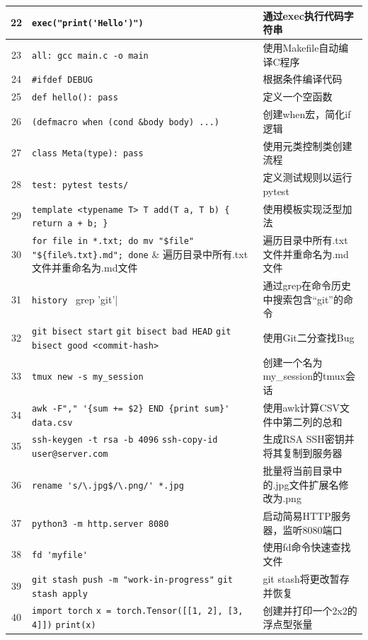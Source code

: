 \documentclass{article}
\begin{document}
\begin{longtable}{|c|p{10cm}|l|}
\hline
22 & \verb|exec("print('Hello')")| & 通过exec执行代码字符串 \\
\hline
23 & \verb|all: gcc main.c -o main| & 使用Makefile自动编译C程序 \\
\hline
24 & \verb|#ifdef DEBUG| & 根据条件编译代码 \\
\hline
25 & \verb|def hello(): pass| & 定义一个空函数 \\
\hline
26 & \verb|(defmacro when (cond &body body) ...)| & 创建when宏，简化if逻辑 \\
\hline
27 & \verb|class Meta(type): pass| & 使用元类控制类创建流程 \\
\hline
28 & \verb|test: pytest tests/| & 定义测试规则以运行pytest \\
\hline
29 & \verb|template <typename T> T add(T a, T b) { return a + b; }| & 使用模板实现泛型加法 \\
\hline
30 & \verb|for file in *.txt; do mv "$file" "${file%.txt}.md"; done| & 遍历目录中所有.txt文件并重命名为.md文件 \\
\hline
31 & \verb|history | grep 'git'| & 通过grep在命令历史中搜索包含“git”的命令 \\
\hline
32 & \verb|git bisect start| \newline \verb|git bisect bad HEAD| \newline \verb|git bisect good <commit-hash>| & 使用Git二分查找Bug \\
\hline
33 & \verb|tmux new -s my_session| & 创建一个名为my_session的tmux会话 \\
\hline
34 & \verb|awk -F"," '{sum += $2} END {print sum}' data.csv| & 使用awk计算CSV文件中第二列的总和 \\
\hline
35 & \verb|ssh-keygen -t rsa -b 4096| \newline \verb|ssh-copy-id user@server.com| & 生成RSA SSH密钥并将其复制到服务器 \\
\hline
36 & \verb|rename 's/\.jpg$/\.png/' *.jpg| & 批量将当前目录中的.jpg文件扩展名修改为.png \\
\hline
37 & \verb|python3 -m http.server 8080| & 启动简易HTTP服务器，监听8080端口 \\
\hline
38 & \verb|fd 'myfile'| & 使用fd命令快速查找文件 \\
\hline
39 & \verb|git stash push -m "work-in-progress"| \newline \verb|git stash apply| & git stash将更改暂存并恢复 \\
\hline
40 & \verb|import torch| \newline \verb|x = torch.Tensor([[1, 2], [3, 4]])| \newline \verb|print(x)| & 创建并打印一个2x2的浮点型张量 \\

\end{longtable}
\end{document}
